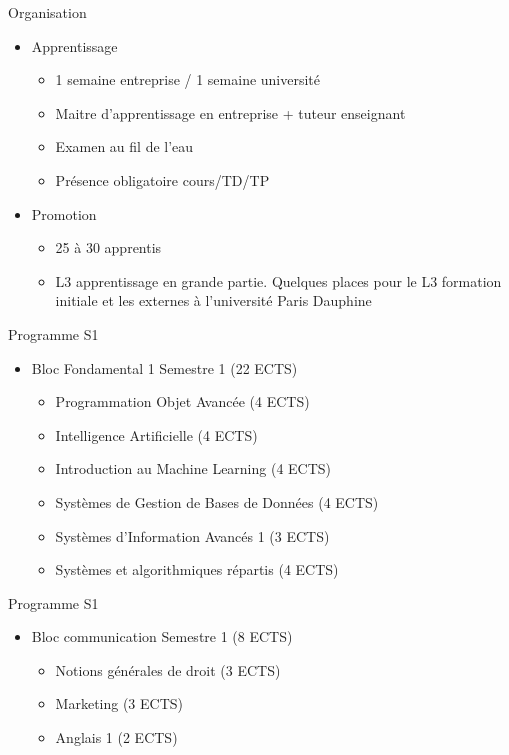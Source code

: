 \documentclass[minimal,compress]{beamer}
\begin{document}
\begin{frame}{Organisation}
\begin{itemize}
\item Apprentissage
\begin{itemize}
\item 1 semaine entreprise / 1 semaine université
\item 	Maitre d’apprentissage en entreprise + tuteur enseignant
\item 	Examen au fil de l’eau
\item 	Présence obligatoire cours/TD/TP

\end{itemize}
\item Promotion
\begin{itemize}
\item 25 à 30 apprentis
\item L3 apprentissage  en grande partie. Quelques places pour le L3 formation initiale et les externes à l’université Paris Dauphine
\end{itemize}
\end{itemize}
\end{frame}



\begin{frame}{Programme S1}
\begin{itemize}
\item \alert{Bloc Fondamental 1} Semestre 1 (22 ECTS)
\begin{itemize}
\item Programmation Objet Avancée (4 ECTS)
\item Intelligence Artificielle (4 ECTS)
\item Introduction au Machine Learning (4 ECTS)
\item Systèmes de Gestion de Bases de Données  (4 ECTS)
\item Systèmes d’Information Avancés 1 (3 ECTS)
\item Systèmes et algorithmiques répartis (4 ECTS)
\end{itemize}
\end{itemize}
\end{frame}

\begin{frame}{Programme S1}
\begin{itemize}
\item \alert{Bloc communication} Semestre 1 (8 ECTS)
\begin{itemize}
\item Notions générales de droit (3 ECTS)
\item Marketing (3 ECTS)	
\item Anglais 1 (2 ECTS)
\end{itemize}
\end{itemize}
\end{frame}
\end{document}

